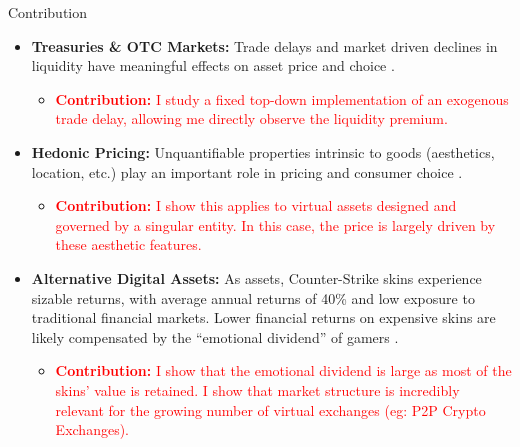 \documentclass[xcolor=table, envcountsect,12pt]{beamer}
\theoremstyle{remark}
\theoremstyle{theorem}
\theoremstyle{plain}
\begin{document}
\begin{frame}[shrink=20]{Contribution}
	\begin{itemize}
		\item \footnotesize  \textbf{Treasuries \& OTC Markets:} Trade delays and market driven declines in liquidity have meaningful effects on asset price and choice \parencites{dgp_2005}{dgp_2007}{krishna_2002}{lagos_rocheteau_2007}{amihud_et_al_2006}{geromichalos_et_al_2016}.
		\begin{itemize}
			\item \footnotesize  \textcolor{red}{\textbf{Contribution:} I study a fixed top-down implementation of an exogenous trade delay, allowing me directly observe the liquidity premium.}
		\end{itemize}
		\item \footnotesize  \textbf{Hedonic Pricing:} Unquantifiable properties intrinsic to goods (aesthetics, location, etc.) play an important role in pricing and consumer choice \parencites{lancaster_1966}{rosen_1974}{rosen1986}{sirmans_2005}.
		\begin{itemize}
			\item \footnotesize  \textcolor{red}{\textbf{Contribution:} I show this applies to virtual assets designed and governed by a singular entity. In this case, the price is largely driven by these aesthetic features.}
		\end{itemize}
		\item \footnotesize  \textbf{Alternative Digital Assets:} As assets, Counter-Strike skins experience sizable returns, with average annual returns of 40\% and low exposure to traditional financial markets. Lower financial returns on expensive skins are likely compensated by the ``emotional dividend'' of gamers \parencite{dobrynskaya_2025}.
		\begin{itemize}
			\item \footnotesize \textcolor{red}{\textbf{Contribution:} I show that the emotional dividend is large as most of the skins' value is retained. I show that market structure is incredibly relevant for the growing number of virtual exchanges (eg: P2P Crypto Exchanges).}
		\end{itemize}
	\end{itemize}
\end{frame}

\end{document}
